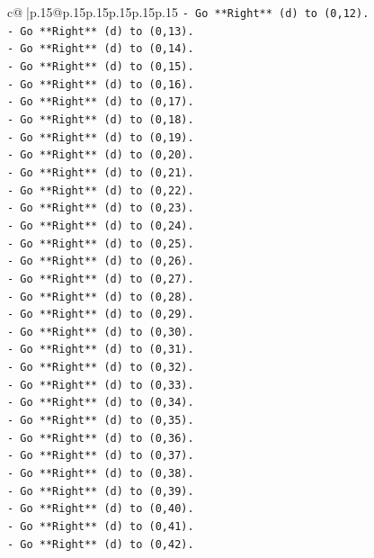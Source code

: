 \documentclass{article}
\begin{document}
{\begin{supertabular}{c@{$\;$}|p{.15\linewidth}@{}p{.15\linewidth}p{.15\linewidth}p{.15\linewidth}p{.15\linewidth}p{.15\linewidth}}
{{{\texttt{{-} Go **Right** (d) to (0,12).} \\
\texttt{{-} Go **Right** (d) to (0,13).} \\
\texttt{{-} Go **Right** (d) to (0,14).} \\
\texttt{{-} Go **Right** (d) to (0,15).} \\
\texttt{{-} Go **Right** (d) to (0,16).} \\
\texttt{{-} Go **Right** (d) to (0,17).} \\
\texttt{{-} Go **Right** (d) to (0,18).} \\
\texttt{{-} Go **Right** (d) to (0,19).} \\
\texttt{{-} Go **Right** (d) to (0,20).} \\
\texttt{{-} Go **Right** (d) to (0,21).} \\
\texttt{{-} Go **Right** (d) to (0,22).} \\
\texttt{{-} Go **Right** (d) to (0,23).} \\
\texttt{{-} Go **Right** (d) to (0,24).} \\
\texttt{{-} Go **Right** (d) to (0,25).} \\
\texttt{{-} Go **Right** (d) to (0,26).} \\
\texttt{{-} Go **Right** (d) to (0,27).} \\
\texttt{{-} Go **Right** (d) to (0,28).} \\
\texttt{{-} Go **Right** (d) to (0,29).} \\
\texttt{{-} Go **Right** (d) to (0,30).} \\
\texttt{{-} Go **Right** (d) to (0,31).} \\
\texttt{{-} Go **Right** (d) to (0,32).} \\
\texttt{{-} Go **Right** (d) to (0,33).} \\
\texttt{{-} Go **Right** (d) to (0,34).} \\
\texttt{{-} Go **Right** (d) to (0,35).} \\
\texttt{{-} Go **Right** (d) to (0,36).} \\
\texttt{{-} Go **Right** (d) to (0,37).} \\
\texttt{{-} Go **Right** (d) to (0,38).} \\
\texttt{{-} Go **Right** (d) to (0,39).} \\
\texttt{{-} Go **Right** (d) to (0,40).} \\
\texttt{{-} Go **Right** (d) to (0,41).} \\
\texttt{{-} Go **Right** (d) to (0,42).} \\
}}}
\end{supertabular}}
\end{document}
